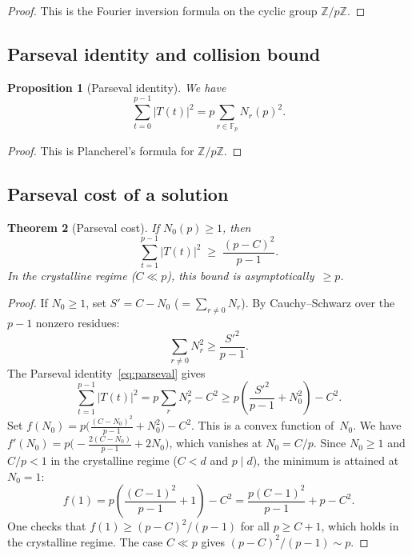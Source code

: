 \documentclass[12pt, a4paper]{amsart}
\theoremstyle{plain}
\newtheorem{theorem}{Theorem}[section]
\newtheorem{proposition}[theorem]{Proposition}
\theoremstyle{definition}
\theoremstyle{remark}
\newcommand{\Z}{\mathbb{Z}}
\newcommand{\Fp}{\mathbb{F}_p}
\begin{document}
\begin{proof}
  This is the Fourier inversion formula on the cyclic group
  $\Z/p\Z$.
\end{proof}

\subsection{Parseval identity and collision bound}

\begin{proposition}[Parseval identity]\label{prop:parseval}
  We have
  \begin{equation}\label{eq:parseval}
    \sum_{t=0}^{p-1} |T(t)|^2
    = p \sum_{r \in \Fp} N_r(p)^2.
  \end{equation}
\end{proposition}

\begin{proof}
  This is Plancherel's formula for $\Z/p\Z$.
\end{proof}

\subsection{Parseval cost of a solution}

\begin{theorem}[Parseval cost]\label{thm:parseval-cost}
  If $N_0(p) \geq 1$, then
  \begin{equation}\label{eq:parseval-cost}
    \sum_{t=1}^{p-1} |T(t)|^2
    \;\geq\; \frac{(p - C)^2}{p - 1}.
  \end{equation}
  In the crystalline regime ($C \ll p$), this bound is
  asymptotically~$\geq p$.
\end{theorem}

\begin{proof}
  If $N_0 \geq 1$, set $S' = C - N_0$ ($= \sum_{r \neq 0} N_r$).
  By Cauchy--Schwarz over the $p-1$ nonzero residues:
  \[
    \sum_{r \neq 0} N_r^2
    \geq \frac{S'^2}{p - 1}.
  \]
  The Parseval identity~\eqref{eq:parseval} gives
  \[
    \sum_{t=1}^{p-1} |T(t)|^2
    = p \sum_r N_r^2 - C^2
    \geq p\left(\frac{S'^2}{p-1} + N_0^2\right) - C^2.
  \]
  Set $f(N_0) = p\bigl(\frac{(C-N_0)^2}{p-1} + N_0^2\bigr)
  - C^2$. This is a convex function of~$N_0$.
  We have $f'(N_0) = p\bigl(-\frac{2(C-N_0)}{p-1} + 2N_0\bigr)$,
  which vanishes at $N_0 = C/p$.
  Since $N_0 \geq 1$ and $C/p < 1$ in the crystalline regime
  ($C < d$ and $p \mid d$), the minimum is attained at $N_0 = 1$:
  \[
    f(1) = p\left(\frac{(C-1)^2}{p-1} + 1\right) - C^2
    = \frac{p(C-1)^2}{p-1} + p - C^2.
  \]
  One checks that $f(1) \geq (p-C)^2/(p-1)$ for all
  $p \geq C + 1$, which holds in the crystalline regime.
  The case $C \ll p$ gives $(p - C)^2/(p-1) \sim p$.
\end{proof}
\end{document}

